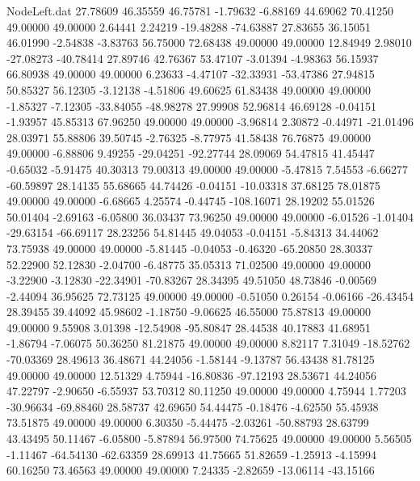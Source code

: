 \begin{filecontents}{NodeLeft.dat}
  27.78609   46.35559   46.75781    -1.79632   -6.88169   44.69062   70.41250   49.00000   49.00000    2.64441    2.24219  -19.48288  -74.63887
  27.83655   36.15051   46.01990    -2.54838   -3.83763   56.75000   72.68438   49.00000   49.00000   12.84949    2.98010  -27.08273  -40.78414
  27.89746   42.76367   53.47107    -3.01394   -4.98363   56.15937   66.80938   49.00000   49.00000    6.23633   -4.47107  -32.33931  -53.47386
  27.94815   50.85327   56.12305    -3.12138   -4.51806   49.60625   61.83438   49.00000   49.00000   -1.85327   -7.12305  -33.84055  -48.98278
  27.99908   52.96814   46.69128    -0.04151   -1.93957   45.85313   67.96250   49.00000   49.00000   -3.96814    2.30872   -0.44971  -21.01496
  28.03971   55.88806   39.50745    -2.76325   -8.77975   41.58438   76.76875   49.00000   49.00000   -6.88806    9.49255  -29.04251  -92.27744
  28.09069   54.47815   41.45447    -0.65032   -5.91475   40.30313   79.00313   49.00000   49.00000   -5.47815    7.54553   -6.66277  -60.59897
  28.14135   55.68665   44.74426    -0.04151  -10.03318   37.68125   78.01875   49.00000   49.00000   -6.68665    4.25574   -0.44745 -108.16071
  28.19202   55.01526   50.01404    -2.69163   -6.05800   36.03437   73.96250   49.00000   49.00000   -6.01526   -1.01404  -29.63154  -66.69117
  28.23256   54.81445   49.04053    -0.04151   -5.84313   34.44062   73.75938   49.00000   49.00000   -5.81445   -0.04053   -0.46320  -65.20850
  28.30337   52.22900   52.12830    -2.04700   -6.48775   35.05313   71.02500   49.00000   49.00000   -3.22900   -3.12830  -22.34901  -70.83267
  28.34395   49.51050   48.73846    -0.00569   -2.44094   36.95625   72.73125   49.00000   49.00000   -0.51050    0.26154   -0.06166  -26.43454
  28.39455   39.44092   45.98602    -1.18750   -9.06625   46.55000   75.87813   49.00000   49.00000    9.55908    3.01398  -12.54908  -95.80847
  28.44538   40.17883   41.68951    -1.86794   -7.06075   50.36250   81.21875   49.00000   49.00000    8.82117    7.31049  -18.52762  -70.03369
  28.49613   36.48671   44.24056    -1.58144   -9.13787   56.43438   81.78125   49.00000   49.00000   12.51329    4.75944  -16.80836  -97.12193
  28.53671   44.24056   47.22797    -2.90650   -6.55937   53.70312   80.11250   49.00000   49.00000    4.75944    1.77203  -30.96634  -69.88460
  28.58737   42.69650   54.44475    -0.18476   -4.62550   55.45938   73.51875   49.00000   49.00000    6.30350   -5.44475   -2.03261  -50.88793
  28.63799   43.43495   50.11467    -6.05800   -5.87894   56.97500   74.75625   49.00000   49.00000    5.56505   -1.11467  -64.54130  -62.63359
  28.69913   41.75665   51.82659    -1.25913   -4.15994   60.16250   73.46563   49.00000   49.00000    7.24335   -2.82659  -13.06114  -43.15166

\end{filecontents}
